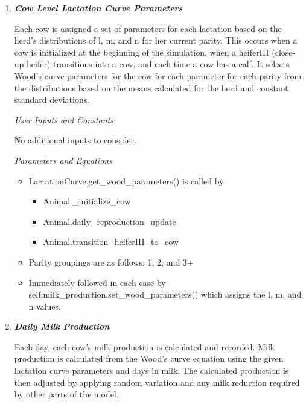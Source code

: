 \documentclass{article}
\begin{document}
\begin{refsection}
\begin{enumerate}
        \item \textbf{\textit{Cow Level Lactation Curve Parameters}} 
        \vspace{-0.1cm}
        
        Each cow is assigned a set of parameters for each lactation based on the herd’s distributions of l, m, and n for her current parity. This occurs when a cow is initialized at the beginning of the simulation, when a heiferIII (close-up heifer) transitions into a cow, and each time a cow has a calf. It selects Wood’s curve parameters for the cow for each parameter for each parity from the distributions based on the means calculated for the herd and constant standard deviations.
         \vspace{0.1cm}

         \textit{User Inputs and Constants}
         \vspace{0.1cm}

         No additional inputs to consider. 
         
         \textit{Parameters and Equations}
         \vspace{0.1cm}

        \begin{itemize}
            \item LactationCurve.get\_wood\_parameters() is called by
            \begin{itemize}
                \item Animal.\_initialize\_cow
                \item Animal.daily\_reproduction\_update
                \item Animal.transition\_heiferIII\_to\_cow
            \end{itemize}
            \item Parity groupings are as follows: 1, 2, and 3+ 
            \item Immediately followed in each case by self.milk\_production.set\_wood\_parameters() which assigns the l, m, and n values.
        \end{itemize}
            \vspace{0.25cm}

        \item \textbf{\textit{Daily Milk Production}} 
        \vspace{0.1cm}
        
        Each day, each cow’s milk production is calculated and recorded. Milk production is calculated from the Wood’s curve equation using the given lactation curve parameters and days in milk. The calculated production is then adjusted by applying random variation and any milk reduction required by other parts of the model. 
         \vspace{0.1cm}


\end{enumerate}
\end{refsection}
\end{document}
